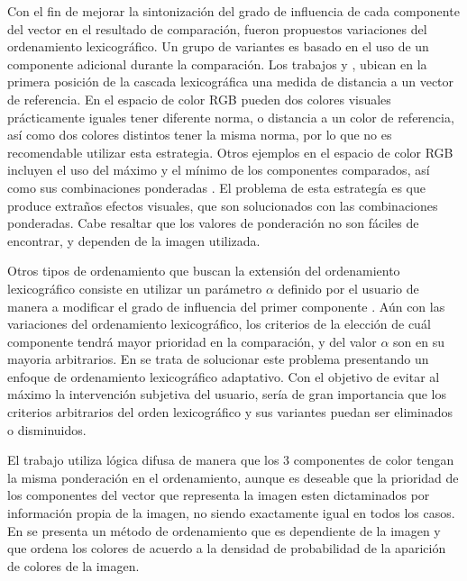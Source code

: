 Con el fin de mejorar la sintonizaci\'on del grado de influencia de cada componente del vector en el resultado de comparaci\'on, fueron propuestos variaciones del ordenamiento lexicogr\'afico. Un grupo de variantes es basado en el uso de un componente adicional durante la comparaci\'on. Los trabajos \cite{angulo2005morphological} y \cite{sartor2001morphological}, ubican en la primera posici\'on de la cascada lexicogr\'afica una medida de distancia a un vector de referencia. En el espacio de color RGB pueden dos colores visuales pr\'acticamente iguales tener diferente norma, o distancia a un color de referencia, as\'i como dos colores distintos tener la misma norma, por lo que no es recomendable utilizar esta estrategia. Otros ejemplos en el espacio de color RGB incluyen el uso del m\'aximo y el m\'inimo de los componentes comparados, as\'i como sus combinaciones ponderadas \cite{angulo2003morphological}. El problema de esta estrateg\'ia es que produce extra\~nos efectos visuales, que son solucionados con las combinaciones ponderadas. Cabe resaltar que los valores de ponderaci\'on no son f\'aciles de encontrar, y dependen de la imagen utilizada.

Otros tipos de ordenamiento que buscan la extensi\'on del ordenamiento lexicogr\'afico consiste en utilizar un par\'ametro $\alpha$ definido por el usuario de manera a modificar el grado de influencia del primer componente \cite{angulo2003morphologie,angulo2005unified}.  A\'un con las variaciones del ordenamiento lexicogr\'afico, los criterios de la elecci\'on de cu\'al componente tendr\'a mayor prioridad en la comparaci\'on, y del valor $\alpha$ son en su mayoria arbitrarios. En \cite{gao2013adaptive} se trata de solucionar este problema presentando  un enfoque de ordenamiento lexicogr\'afico adaptativo. 
Con el objetivo de evitar al m\'aximo la intervenci\'on subjetiva del usuario, ser\'ia de gran
importancia que los criterios arbitrarios del orden lexicogr\'afico y sus variantes puedan ser eliminados o disminuidos.


El trabajo \cite{bouchet2016fuzzy} utiliza l\'ogica difusa de manera que los 3 componentes de color tengan la misma ponderaci\'on en el ordenamiento, aunque es deseable que la prioridad de los componentes del vector que representa la imagen esten dictaminados por informaci\'on propia de la imagen, no siendo exactamente igual en todos los casos. En \cite{benavent2012mathematical} se presenta un m\'etodo de ordenamiento que es dependiente de la imagen y que ordena los colores de acuerdo a la densidad de probabilidad de la aparici\'on de colores de la imagen. 

